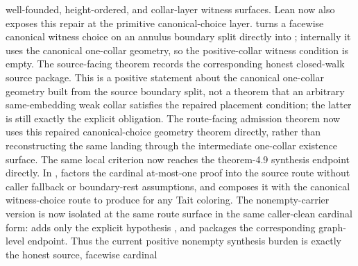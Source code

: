 \documentclass[11pt]{article}
\begin{document}
well-founded, height-ordered, and collar-layer witness surfaces.
Lean now also exposes this repair at the primitive canonical-choice layer.
turns a facewise canonical witness choice on an annulus boundary split directly
into ; internally it
uses the canonical one-collar geometry, so the positive-collar witness condition
is empty.  The source-facing theorem
records the corresponding honest closed-walk source package.  This is a
positive statement about the canonical one-collar geometry built from the
source boundary split, not a theorem that an arbitrary same-embedding weak
collar satisfies the repaired placement condition; the latter is still exactly
the explicit  obligation.  The route-facing
admission theorem
now uses this repaired canonical-choice geometry theorem directly, rather than
reconstructing the same landing through the intermediate one-collar existence
surface.
The same local criterion now reaches the theorem-4.9 synthesis endpoint
directly.  In ,
factors the cardinal at-most-one proof into the source route without caller
fallback or boundary-rest assumptions, and
composes it with the canonical witness-choice route to produce
 for any Tait coloring.
The nonempty-carrier version is now isolated at the same route surface in the
same caller-clean cardinal form:
adds only the explicit hypothesis
, and
packages the corresponding graph-level endpoint.  Thus the current positive
nonempty synthesis burden is exactly the honest source, facewise cardinal
\end{document}
